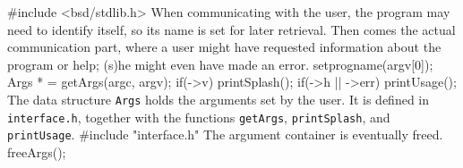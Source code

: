 #include <bsd/stdlib.h>
\nwendcode{}\nwdocspar
When communicating with the user, the program may need to identify
itself, so its name is set for later retrieval. Then comes the actual
communication part, where a user might have requested information
about the program or help; (s)he might even have made an error.
\nwenddocs{}\endmoddef\nwstartdeflinemarkup{}\nwenddeflinemarkup
setprogname(argv[0]);
Args * = getArgs(argc, argv);
if(->v)
  printSplash();
if(->h || ->err)
  printUsage();
\nwendcode{}\nwdocspar
The data structure \texttt{Args} holds the arguments set by the
user. It is defined in \texttt{interface.h}, together with the
functions \texttt{getArgs}, \texttt{printSplash}, and
\texttt{printUsage}.
\nwenddocs{}\plusendmoddef\nwstartdeflinemarkup{}\nwenddeflinemarkup
#include "interface.h"
\nwendcode{}\nwdocspar
The argument container is eventually freed.
\nwenddocs{}\endmoddef\nwstartdeflinemarkup{}\nwenddeflinemarkup
freeArgs();
\nwendcode{}\nwdocspar
